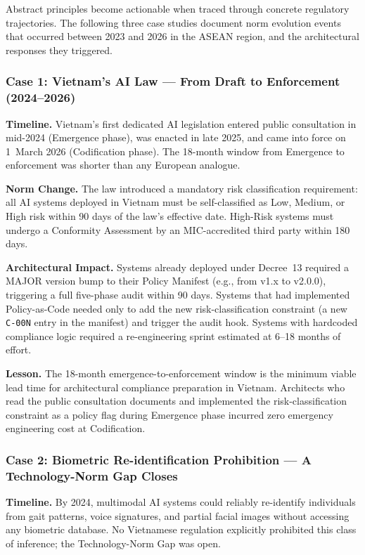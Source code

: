 Abstract principles become actionable when traced through concrete regulatory trajectories. The following three case studies document norm evolution events that occurred between 2023 and 2026 in the ASEAN region, and the architectural responses they triggered.

\subsubsection*{Case 1: Vietnam's AI Law — From Draft to Enforcement (2024--2026)}

\textbf{Timeline.} Vietnam's first dedicated AI legislation entered public consultation in mid-2024 (Emergence phase), was enacted in late 2025, and came into force on 1~March 2026 (Codification phase). The 18-month window from Emergence to enforcement was shorter than any European analogue.

\textbf{Norm Change.} The law introduced a mandatory risk classification requirement: all AI systems deployed in Vietnam must be self-classified as Low, Medium, or High risk within 90 days of the law's effective date. High-Risk systems must undergo a Conformity Assessment by an MIC-accredited third party within 180 days.

\textbf{Architectural Impact.} Systems already deployed under Decree~13 required a MAJOR version bump to their Policy Manifest (e.g., from v1.x to v2.0.0), triggering a full five-phase audit within 90 days. Systems that had implemented Policy-as-Code needed only to add the new risk-classification constraint (a new \texttt{C-00N} entry in the manifest) and trigger the audit hook. Systems with hardcoded compliance logic required a re-engineering sprint estimated at 6--18 months of effort.

\textbf{Lesson.} The 18-month emergence-to-enforcement window is the minimum viable lead time for architectural compliance preparation in Vietnam. Architects who read the public consultation documents and implemented the risk-classification constraint as a policy flag during Emergence phase incurred zero emergency engineering cost at Codification.

\subsubsection*{Case 2: Biometric Re-identification Prohibition --- A Technology-Norm Gap Closes}

\textbf{Timeline.} By 2024, multimodal AI systems could reliably re-identify individuals from gait patterns, voice signatures, and partial facial images without accessing any biometric database. No Vietnamese regulation explicitly prohibited this class of inference; the Technology-Norm Gap was open.

